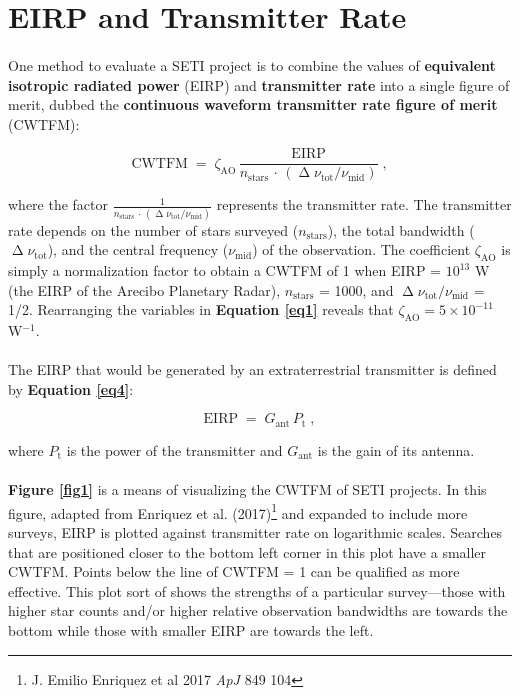\documentclass{article}
\begin{document}
\section{EIRP and Transmitter Rate}

\paragraph{}
One method to evaluate a SETI project is to combine the values of \textbf{equivalent isotropic radiated power} (EIRP) and \textbf{transmitter rate} into a single figure of merit, dubbed the \textbf{continuous waveform transmitter rate figure of merit} (CWTFM):

\begin{equation}
\textrm{CWTFM} \; = \; \zeta_{\textrm{AO}} \, \frac{\textrm{EIRP}}{n_{\textrm{stars}} \, \cdot \, (\upDelta \nu_{\textrm{tot}} / \nu_{\textrm{mid}})} \; ,
\label{eq1}
\end{equation}

where the factor $\frac{1}{n_{\textrm{stars}} \, \cdot \, (\upDelta \nu_{\textrm{tot}} / \nu_{\textrm{mid}})}$ represents the transmitter rate. The transmitter rate depends on the number of stars surveyed ($n_{\textrm{stars}}$), the total bandwidth ($\upDelta \nu_{\textrm{tot}}$), and the central frequency ($\nu_{\textrm{mid}}$) of the observation. The coefficient $\zeta_{\textrm{AO}}$ is simply a normalization factor to obtain a CWTFM of 1 when EIRP = $10^{13}$ W (the EIRP of the Arecibo Planetary Radar),  $n_{\textrm{stars}}$ = 1000, and $\upDelta \nu_{\textrm{tot}} / \nu_{\textrm{mid}}$ = 1/2. Rearranging the variables in \textbf{Equation \ref{eq1}} reveals that $\zeta_{\textrm{AO}} = 5 \times 10^{-11}$ W$^{-1}$.

\paragraph{}
The EIRP that would be generated by an extraterrestrial transmitter is defined by \textbf{Equation \ref{eq4}}:

\begin{equation}
\textrm{EIRP} \; = \; G_{\textrm{ant}} \, P_{\textrm{t}} \; ,
\label{eq4}
\end{equation}

where $P_{\textrm{t}}$ is the power of the transmitter and $G_{\textrm{ant}}$ is the gain of its antenna.

\paragraph{}
\textbf{Figure \ref{fig1}} is a means of visualizing the CWTFM of SETI projects. In this figure, adapted from Enriquez et al. (2017)\footnote{J. Emilio Enriquez et al 2017 \textit{ApJ} 849 104} and expanded to include more surveys, EIRP is plotted against transmitter rate on logarithmic scales. Searches that are positioned closer to the bottom left corner in this plot have a smaller CWTFM. Points below the line of CWTFM = 1 can be qualified as more effective. This plot sort of shows the strengths of a particular survey---those with higher star counts and/or higher relative observation bandwidths are towards the bottom while those with smaller EIRP are towards the left.
\end{document}
